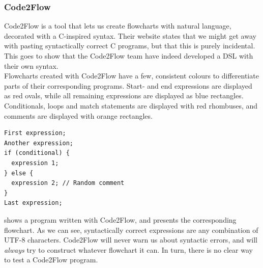 
\subsubsection{Code2Flow}

Code2Flow is a tool that lets us create flowcharts with natural language, decorated with a C-inspired syntax. Their website states that we might get away with pasting syntactically correct C programs, but that this is purely incidental. This goes to show that the Code2Flow team have indeed developed a DSL with their own syntax. \\

Flowcharts created with Code2Flow have a few, consistent colours to differentiate parts of their corresponding programs. Start- and end expressions are displayed as red ovals, while all remaining expressions are displayed as blue rectangles. Conditionals, loops and match statements are displayed with red rhombuses, and comments are displayed with orange rectangles. \\

\begin{lstlisting}[caption={A Code2Flow program.}, captionpos=b, label={A Code2Flow program.}]
First expression;
Another expression;
if (conditional) {
  expression 1;
} else {
  expression 2; // Random comment
}
Last expression;
\end{lstlisting}

 shows a program written with Code2Flow, and  presents the corresponding flowchart. As we can see, syntactically correct expressions are any combination of UTF-8 characters. Code2Flow will never warn us about syntactic errors, and will \textit{always} try to construct whatever flowchart it can. In turn, there is no clear way to test a Code2Flow program. \\

